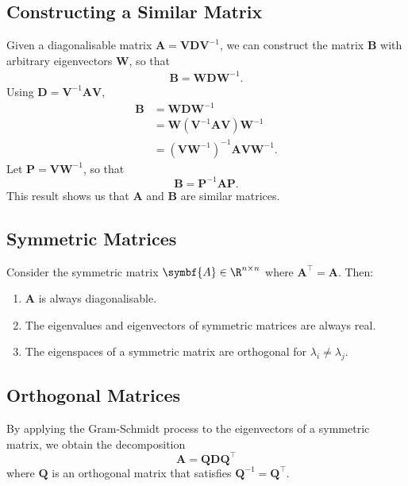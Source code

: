 \documentclass{article}
\begin{document}
\subsection{Constructing a Similar Matrix}
Given a diagonalisable matrix \(\symbf{A} =
\symbf{V}\symbf{D}\symbf{V}^{-1}\), we can construct the matrix
\(\symbf{B}\) with arbitrary eigenvectors \(\symbf{W}\), so that
\begin{align*}
    \symbf{B} = \symbf{W} \symbf{D} \symbf{W}^{-1}.
\end{align*}
Using \(\symbf{D} = \symbf{V}^{-1} \symbf{A} \symbf{V}\),
\begin{align*}
    \symbf{B} & = \symbf{W} \symbf{D} \symbf{W}^{-1}                                               \\
              & = \symbf{W} \left( \symbf{V}^{-1} \symbf{A} \symbf{V} \right) \symbf{W}^{-1}       \\
              & = \left( \symbf{V} \symbf{W}^{-1} \right)^{-1} \symbf{A} \symbf{V} \symbf{W}^{-1}.
\end{align*}
Let \(\symbf{P} = \symbf{V} \symbf{W}^{-1}\), so that
\begin{equation*}
    \symbf{B} = \symbf{P}^{-1} \symbf{A} \symbf{P}.
\end{equation*}
This result shows us that \(\symbf{A}\) and \(\symbf{B}\) are similar matrices.
\subsection{Symmetric Matrices}
Consider the symmetric matrix \(\symbf{A}\in\R^{n \times n}\) where
\(\symbf{A}^\top = \symbf{A}\). Then:
\begin{enumerate}
    \item \(\symbf{A}\) is always diagonalisable.
    \item The eigenvalues and eigenvectors of symmetric matrices are
          always real.
    \item The eigenspaces of a symmetric matrix are orthogonal for
          \(\lambda_i \neq \lambda_j\).
\end{enumerate}
\subsection{Orthogonal Matrices}
By applying the Gram-Schmidt process to the eigenvectors of a symmetric
matrix, we obtain the decomposition
\begin{equation*}
    \symbf{A} = \symbf{Q} \symbf{D} \symbf{Q}^\top
\end{equation*}
where \(\symbf{Q}\) is an orthogonal matrix that satisfies \(\symbf{Q}^{-1} = \symbf{Q}^\top\).
\end{document}

